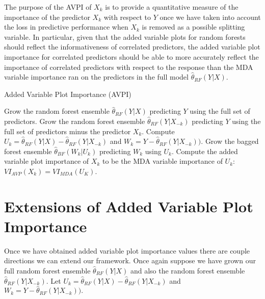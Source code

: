 \documentclass[12pt,twoside]{reedthesis}
\theoremstyle{definition}
\theoremstyle{definition}
\theoremstyle{definition}
\theoremstyle{remark}
\begin{document}
The purpose of the AVPI of \(X_k\) is to provide a quantitative measure
of the importance of the predictor \(X_k\) with respect to \(Y\) once we
have taken into account the loss in predictive performance when \(X_k\)
is removed as a possible splitting variable. In particular, given that
the added variable plots for random forests should reflect the
informativeness of correlated predictors, the added variable plot
importance for correlated predictors should be able to more accurately
reflect the importance of correlated predictors with respect to the
response than the MDA variable importance ran on the predictors in the
full model \(\hat{\theta}_{RF}(Y|X)\). \par
\begin{algorithm}
    \caption{Added Variable Plot Importance (AVPI)} \label{added variable importance}
      \begin{algorithmic}[1]
          \State Grow the random forest ensemble $\hat{\theta}_{RF}(Y|X)$ predicting $Y$ using the full set of predictors. 
            \State Grow the random forest ensemble $\hat{\theta}_{RF}(Y|X_{-k})$ predicting $Y$ using the full set of predictors minus the predictor $X_k$.
            \State Compute $U_k=\hat{\theta}_{RF}(Y|X)-\hat{\theta}_{RF}(Y|X_{-k})$ and $W_k=Y-\hat{\theta}_{RF}(Y|X_{-k})).$
            \State Grow the bagged forest ensemble $\hat{\theta}_{BF}(W_k|U_k)$ predicting $W_k$ using $U_k$. 
            \State Compute the added variable plot importance of $X_k$ to be the MDA variable importance of $U_k$: $VI_{AVP}(X_k)=VI_{MDA}(U_K)$.
          \EndFor
      \end{algorithmic}
  \end{algorithm}
\section{Extensions of Added Variable Plot
Importance}\label{extensions-of-added-variable-plot-importance}

Once we have obtained added variable plot importance values there are
couple directions we can extend our framework. Once again suppose we
have grown our full random forest ensemble \(\hat{\theta}_{RF}(Y|X)\)
and also the random forest ensemble \(\hat{\theta}_{RF}(Y|X_{-k})\). Let
\(U_k=\hat{\theta}_{RF}(Y|X)-\hat{\theta}_{RF}(Y|X_{-k})\) and
\(W_k=Y-\hat{\theta}_{RF}(Y|X_{-k})).\) \par
\end{document}
